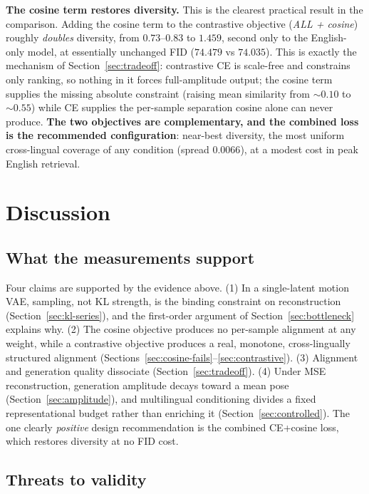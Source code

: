 \documentclass[11pt,a4paper]{report}
\begin{document}
\textbf{The cosine term restores diversity.} This is the clearest practical
result in the comparison. Adding the cosine term to the contrastive
objective (\emph{ALL + cosine}) roughly \emph{doubles} diversity, from
$0.73$--$0.83$ to $1.459$, second only to the English-only model, at
essentially unchanged FID ($74.479$ vs $74.035$). This is exactly the
mechanism of Section~\ref{sec:tradeoff}: contrastive CE is scale-free and
constrains only ranking, so nothing in it forces full-amplitude output; the
cosine term supplies the missing absolute constraint (raising mean
similarity from ${\sim}0.10$ to ${\sim}0.55$) while CE supplies the
per-sample separation cosine alone can never produce. \textbf{The two
objectives are complementary, and the combined loss is the recommended
configuration}: near-best diversity, the most uniform cross-lingual
coverage of any condition (spread $0.0066$), at a modest cost in peak
English retrieval.

\chapter{Discussion}
\label{ch:discussion}

\section{What the measurements support}

Four claims are supported by the evidence above. (1) In a single-latent
motion VAE, sampling, not KL strength, is the binding constraint on
reconstruction (Section~\ref{sec:kl-series}), and the first-order argument
of Section~\ref{sec:bottleneck} explains why. (2) The cosine objective
produces no per-sample alignment at any weight, while a contrastive
objective produces a real, monotone, cross-lingually structured alignment
(Sections~\ref{sec:cosine-fails}--\ref{sec:contrastive}). (3) Alignment and
generation quality dissociate (Section~\ref{sec:tradeoff}). (4) Under MSE
reconstruction, generation amplitude decays toward a mean pose
(Section~\ref{sec:amplitude}), and multilingual conditioning divides a
fixed representational budget rather than enriching it
(Section~\ref{sec:controlled}). The one clearly \emph{positive} design
recommendation is the combined CE+cosine loss, which restores diversity at
no FID cost.

\section{Threats to validity}
\label{sec:threats}
\end{document}
